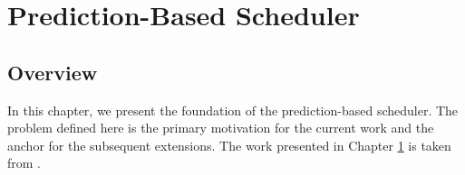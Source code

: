 \chapter{Prediction-Based Scheduler}\label{chap:prediction_based_scheduler}

\section{Overview}
\label{pbs:overview}
In this chapter, we present the foundation of the prediction-based scheduler. The problem defined here is the primary motivation for the current work and the anchor for the subsequent extensions. The work presented in Chapter \ref{chap:prediction_based_scheduler} is taken from \cite{ravan_ensuring_2020}.






















